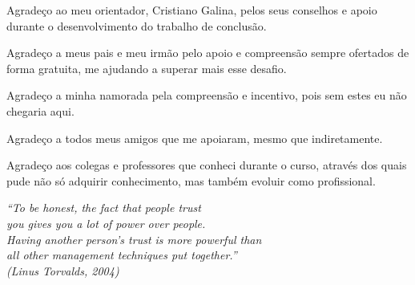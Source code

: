 \documentclass[
	12pt,				%
	openright,			%
	twoside,			%
	a4paper,			%
	final,
    french,             %
	spanish,			%
	english,			%
	brazil				%
	]{abntex2}
\begin{document}
\begin{agradecimentos}
	Agradeço ao meu orientador, Cristiano Galina, pelos seus conselhos e apoio durante o desenvolvimento do trabalho de conclusão.

	Agradeço a meus pais e meu irmão pelo apoio e compreensão sempre ofertados de forma gratuita, me ajudando a superar mais esse desafio.

	Agradeço a minha namorada pela compreensão e incentivo, pois sem estes eu não chegaria aqui.

	Agradeço a todos meus amigos que me apoiaram, mesmo que indiretamente.

	Agradeço aos colegas e professores que conheci durante o curso, através dos quais pude não só adquirir conhecimento, mas também evoluir como profissional.

\end{agradecimentos}

\begin{epigrafe}
	\vspace*{\fill}
	\begin{flushright}
		\textit{``To be honest, the fact that people trust \\
				  you gives you a lot of power over people. \\
		Having another person's trust is more powerful than\\ 
		 all other management techniques put together.'' \\
			(Linus Torvalds, 2004)}
	\end{flushright}
\end{epigrafe}






\listoffigures*
\cleardoublepage

\listoftables*
\cleardoublepage
\end{document}
